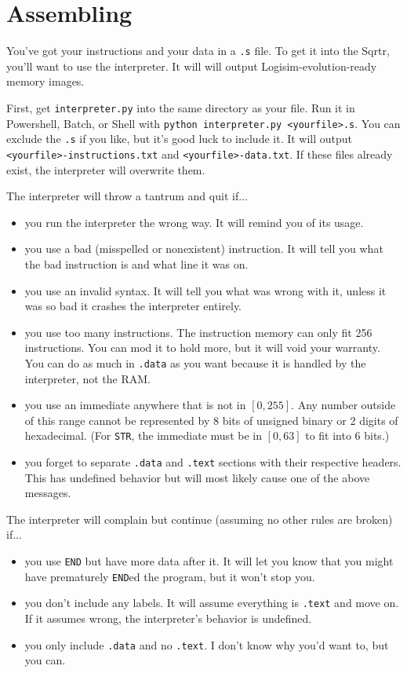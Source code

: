 \documentclass[12pt, oneside]{memoir}
\newcommand{\instruction}[1]{{\color{instruction}\texttt{#1}}}
\newcommand{\header}[1]{{\color{header}\texttt{#1}}}
\begin{document}
\chapter{Assembling}
You've got your instructions and your data in a \texttt{.s} file. To get it into the Sqrtr, you'll want to use the interpreter. It will will output Logisim-evolution-ready memory images. 

First, get \texttt{interpreter.py} into the same directory as your file. Run it in Powershell, Batch, or Shell with \texttt{python interpreter.py <yourfile>.s}. You can exclude the \texttt{.s} if you like, but it's good luck to include it. It will output \texttt{<yourfile>-instructions.txt} and \texttt{<yourfile>-data.txt}. If these files already exist, the interpreter will overwrite them.

The interpreter will throw a tantrum and quit if...
\begin{itemize}
    \item you run the interpreter the wrong way. It will remind you of its usage.
    \item you use a bad (misspelled or nonexistent) instruction. It will tell you what the bad instruction is and what line it was on.
    \item you use an invalid syntax. It will tell you what was wrong with it, unless it was so bad it crashes the interpreter entirely.
    \item you use too many instructions. The instruction memory can only fit 256 instructions. You can mod it to hold more, but it will void your warranty. You can do as much in \header{.data} as you want because it is handled by the interpreter, not the RAM.
    \item you use an immediate anywhere that is not in $[0,255]$. Any number outside of this range cannot be represented by 8 bits of unsigned binary or 2 digits of hexadecimal. (For \instruction{STR}, the immediate must be in $[0,63]$ to fit into 6 bits.)
    \item you forget to separate \header{.data} and \header{.text} sections with their respective headers. This has undefined behavior but will most likely cause one of the above messages.
\end{itemize}

The interpreter will complain but continue (assuming no other rules are broken) if...
\begin{itemize}
    \item you use \instruction{END} but have more data after it. It will let you know that you might have prematurely \instruction{END}ed the program, but it won't stop you.
    \item you don't include any labels. It will assume everything is \header{.text} and move on. If it assumes wrong, the interpreter's behavior is undefined.
    \item you only include \header{.data} and no \header{.text}. I don't know why you'd want to, but you can.
\end{itemize}
\end{document}
